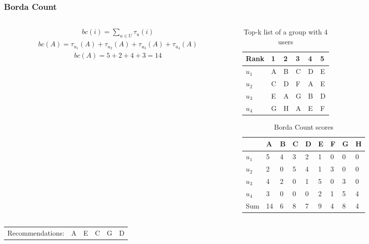 \begin{frame}[t]
\frametitle{Borda Count}
\begin{columns}
\begin{column}{0.45\textwidth}
\begin{align*}
	bc(i) = \sum_{u\in U} \tau_u(i)
\end{align*}
\small
\begin{align*}
	bc(A) = \tau_{u_1}(A) + \tau_{u_2}(A) + \tau_{u_3}(A) + \tau_{u_4}(A)
\end{align*}
\normalsize
\begin{align*}
	bc(A) = 5 + 2 + 4 + 3 = 14
\end{align*}

\end{column}
\begin{column}{0.55\textwidth}
\small
\vspace{-0.5cm}
\begin{table}
\captionsetup{font=footnotesize}
\begin{tabular}{|l|lllll|} \hline
Rank  & 1 & 2 & 3 & 4 & 5 \\\hline
$u_1$ & A & B & C & D & E \\
$u_2$ & C & D & F & A & E \\
$u_3$ & E & A & G & B & D \\
$u_4$ & G & H & A & E & F\\\hline
\end{tabular}
\caption{Top-k list of a group with 4 users}
\end{table}

\vspace{-1cm}
\begin{table}
\begin{tabular}{|l|llllllll|}\hline
      & A & B & C & D & E & F & G & H \\\hline
$u_1$ & 5 & 4 & 3 & 2 & 1 & 0 & 0 & 0 \\
$u_2$ & 2 & 0 & 5 & 4 & 1 & 3 & 0 & 0 \\
$u_3$ & 4 & 2 & 0 & 1 & 5 & 0 & 3 & 0 \\
$u_4$ & 3 & 0 & 0 & 0 & 2 & 1 & 5 & 4 \\\hline
Sum	  & 14& 6 & 8 & 7 & 9 & 4 & 8 & 4 \\\hline
\end{tabular}
\caption{Borda Count scores}
\end{table}
\normalsize
\end{column}
\end{columns}
\begin{table}
\begin{tabular}{llllll}
Recommendations: & A & E & C & G & D
\end{tabular}
\end{table}
\end{frame}

%
%
%
